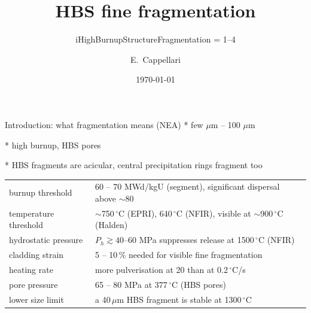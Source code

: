 \documentclass[10pt,aspectratio=169]{beamer}
\title{HBS fine fragmentation}
\subtitle{iHighBurnupStructureFragmentation = 1--4}
\author{E.\ Cappellari}
\date{\today}
\newcommand{\pp}[1]{{\color{paper}#1}}   %
\newcommand{\oo}[1]{{\color{own}#1}}     %
\begin{document}
\maketitle


\begin{frame}{Introduction: what fragmentation means (NEA)}
* few $\mu$m -- 100 $\mu$m 

* high burnup, HBS pores 

* HBS fragments are acicular, central precipitation rings fragment too


\begin{tabular}{ll}
\toprule
burnup threshold & 60 -- 70 MWd/kgU (segment), significant dispersal above $\sim$80\\
temperature threshold & $\sim$750\,$^\circ$C (EPRI), 640\,$^\circ$C (NFIR), visible at $\sim$900\,$^\circ$C (Halden)\\
hydrostatic pressure & $P_h\gtrsim 40$--$60$ MPa suppresses release at 1500\,$^\circ$C (NFIR)\\
cladding strain & 5 -- 10\,\% needed for visible fine fragmentation\\
heating rate & more pulverisation at 20 than at 0.2\,$^\circ$C/s\\
pore pressure & 65 -- 80 MPa at 377\,$^\circ$C (HBS pores)\\
lower size limit & a 40\,$\mu$m HBS fragment is stable at 1300\,$^\circ$C\\
\bottomrule
\end{tabular}
\end{frame}
\end{document}

